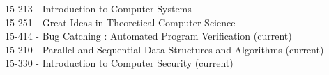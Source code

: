 
\begin{projects}

    \course
    {15-213 -} {Introduction to Computer Systems} \\
    \course
    {15-251 -} {Great Ideas in Theoretical Computer Science} \\
    \course
    {15-414 -} {Bug Catching : Automated Program Verification (current)} \\
    \course
	{15-210 -} {Parallel and Sequential Data Structures and Algorithms (current)} \\
    \course
    {15-330 -} {Introduction to Computer Security (current)}

\end{projects}
